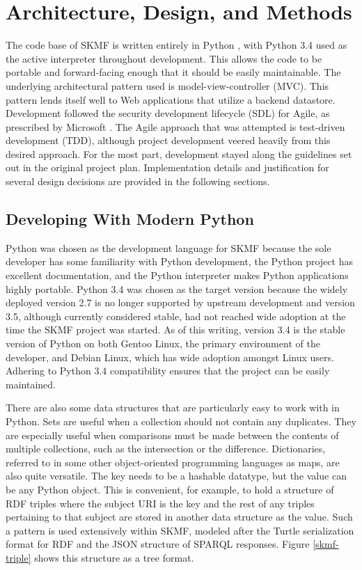 \chapter{Architecture, Design, and Methods}
\label{method}

The code base of SKMF is written entirely in Python
\cite{python},
with Python 3.4 used as the active interpreter throughout development. This allows the code to be portable and forward-facing enough that it should be easily maintainable. The underlying architectural pattern used is model-view-controller (MVC). This pattern lends itself well to Web applications that utilize a backend datastore. Development followed the security development lifecycle (SDL) for Agile, as prescribed by Microsoft
\cite{secdevlifecycle}.
The Agile approach that was attempted is test-driven development (TDD), although project development veered heavily from this desired approach. For the most part, development stayed along the guidelines set out in the original project plan. Implementation details and justification for several design decisions are provided in the following sections.


\section{Developing With Modern Python}
\label{method:python}

Python was chosen as the development language for SKMF because the sole developer has some familiarity with Python development, the Python project has excellent documentation, and the Python interpreter makes Python applications highly portable. Python 3.4 was chosen as the target version because the widely deployed version 2.7 is no longer supported by upstream development and version 3.5, although currently considered stable, had not reached wide adoption at the time the SKMF project was started. As of this writing, version 3.4 is the stable version of Python on both Gentoo Linux, the primary environment of the developer, and Debian Linux, which has wide adoption amongst Linux users. Adhering to Python 3.4 compatibility ensures that the project can be easily maintained.

There are also some data structures that are particularly easy to work with in Python. Sets are useful when a collection should not contain any duplicates. They are especially useful when comparisons must be made between the contents of multiple collections, such as the intersection or the difference. Dictionaries, referred to in some other object-oriented programming languages as maps, are also quite versatile. The key needs to be a hashable datatype, but the value can be any Python object. This is convenient, for example, to hold a structure of RDF triples where the subject URI is the key and the rest of any triples pertaining to that subject are stored in another data structure as the value. Such a pattern is used extensively within SKMF, modeled after the Turtle serialization format for RDF and the JSON structure of SPARQL responses. Figure
\ref{skmf-triple}
shows this structure as a tree format.

